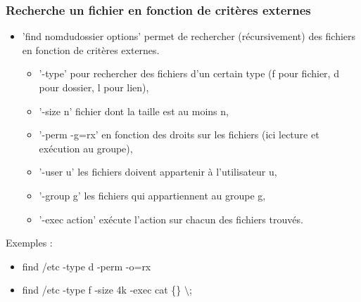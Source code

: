 \documentclass[handout,10pt]{beamer}
\begin{document}
\frame
{
    \frametitle{Recherche un fichier en fonction de critères externes}

    \begin{itemize}
        \item '{\ttfamily find nomdudossier options}' permet de rechercher (récursivement) des fichiers en fonction de critères externes.
            \begin{itemize}
                \item '-type' pour rechercher des fichiers d'un certain type (f pour fichier, d pour dossier, l pour lien),
                \item '-size n' fichier dont la taille est au moins n,
                \item '-perm -g=rx' en fonction des droits sur les fichiers (ici lecture et exécution au groupe),
                \item '-user u' les fichiers doivent appartenir à l'utilisateur u,
                \item '-group g' les fichiers qui appartiennent au groupe g,
                \item '-exec action' exécute l'action sur chacun des fichiers trouvés.
            \end{itemize}
    \end{itemize}

    Exemples :

    \begin{itemize}
        \item {\ttfamily find /etc -type d -perm -o=rx}
        \item {\ttfamily find /etc -type f -size 4k -exec cat \{\} $\setminus$;}
    \end{itemize}
}
\end{document}
